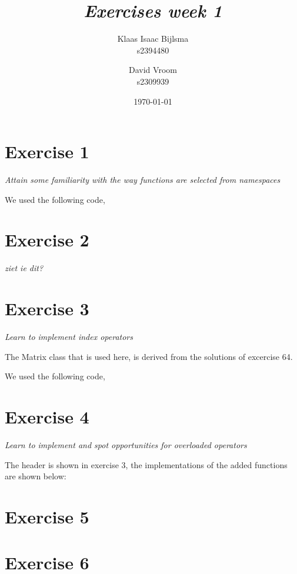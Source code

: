 \documentclass[12pt]{article}
\title{\itshape Exercises week 1}
\author{
	Klaas Isaac Bijlsma \\ s2394480
	\and
	David Vroom \\ s2309939
}
\date{\today}
\newcommand{\desc}[1]{\textit{#1} \vspace{1em}}
\begin{document}
\maketitle

\section*{Exercise 1}
\desc{Attain some familiarity with the way functions are selected from namespaces}

We used the following code,
%

\clearpage
\section*{Exercise 2}
\desc{ziet ie dit?}

\clearpage
\section*{Exercise 3}
\desc{Learn to implement index operators}

The Matrix class that is used here, is derived from the solutions of excercise 64.

We used the following code,


\clearpage
\section*{Exercise 4}
\desc{Learn to implement and spot opportunities for overloaded operators}

The header is shown in exercise 3, the implementations of the added functions are shown below:






\clearpage
\section*{Exercise 5}
\desc{}

\clearpage
\section*{Exercise 6}
\desc{}
\end{document}
